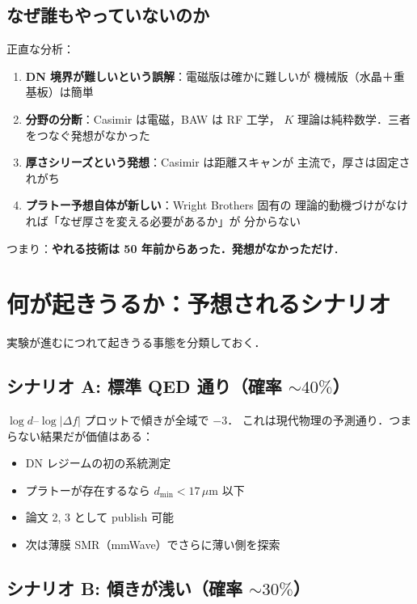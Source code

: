 \documentclass[11pt,a4paper]{article}
\begin{document}
\subsection{なぜ誰もやっていないのか}

正直な分析：

\begin{enumerate}
\item \textbf{DN 境界が難しいという誤解}：電磁版は確かに難しいが
機械版（水晶＋重基板）は簡単
\item \textbf{分野の分断}：Casimir は電磁，BAW は RF 工学，
$K$ 理論は純粋数学．三者をつなぐ発想がなかった
\item \textbf{厚さシリーズという発想}：Casimir は距離スキャンが
主流で，厚さは固定されがち
\item \textbf{プラトー予想自体が新しい}：Wright Brothers 固有の
理論的動機づけがなければ「なぜ厚さを変える必要があるか」が
分からない
\end{enumerate}

つまり：\textbf{やれる技術は 50 年前からあった．発想がなかっただけ}．

\section{何が起きうるか：予想されるシナリオ}

実験が進むにつれて起きうる事態を分類しておく．

\subsection{シナリオ A: 標準 QED 通り（確率 $\sim 40\%$）}

$\log d$--$\log |\Delta f|$ プロットで傾きが全域で $-3$．
これは現代物理の予測通り．つまらない結果だが価値はある：

\begin{itemize}
\item DN レジームの初の系統測定
\item プラトーが存在するなら $d_{\min} < 17\,\mu$m 以下
\item 論文 2, 3 として publish 可能
\item 次は薄膜 SMR（mmWave）でさらに薄い側を探索
\end{itemize}

\subsection{シナリオ B: 傾きが浅い（確率 $\sim 30\%$）}
\end{document}
